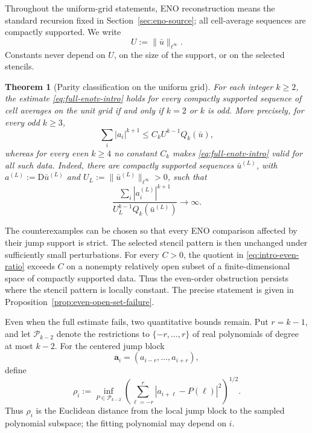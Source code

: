 \documentclass[11pt]{amsart}
\theoremstyle{plain}
\theoremstyle{definition}
\theoremstyle{remark}
\numberwithin{equation}{section}
\theoremstyle{plain}
\newtheorem{lettertheorem}{Theorem}
\begin{document}
Throughout the uniform-grid statements, ENO reconstruction means the standard
recursion fixed in Section~\ref{sec:eno-source}; all cell-average sequences are
compactly supported.  We write
\[
	U:=\|\bar u\|_{\ell^\infty}.
\]
Constants never depend on $U$, on the size of the support, or on the selected
stencils.

\begin{lettertheorem}[Parity classification on the uniform grid]\label{thm:A}
	For each integer $k\ge2$, the estimate
	\eqref{eq:full-enotv-intro} holds for every compactly supported sequence of
	cell averages on the unit grid if and only if $k=2$ or $k$ is odd.  More
	precisely, for every odd $k\ge3$,
	\begin{equation}\label{eq:intro-odd-main}
		\sum_i|a_i|^{k+1}\le C_k U^{k-1}Q_k(\bar u),
	\end{equation}
	whereas for every even $k\ge4$ no constant $C_k$ makes
	\eqref{eq:full-enotv-intro} valid for all such data.  Indeed, there are
	compactly supported sequences $\bar u^{(L)}$, with
	$a^{(L)}:=\mathrm D\bar u^{(L)}$ and
	$U_L:=\|\bar u^{(L)}\|_{\ell^\infty}>0$, such that
	\begin{equation}\label{eq:intro-even-ratio}
		\frac{\displaystyle\sum_i|a_i^{(L)}|^{k+1}}
		{\displaystyle U_L^{k-1}Q_k(\bar u^{(L)})}
		\longrightarrow\infty.
	\end{equation}
\end{lettertheorem}


The counterexamples can be chosen so that every ENO comparison affected by
their jump support is strict.  The selected stencil pattern is then unchanged
under sufficiently small perturbations.  For every $C>0$, the quotient in
\eqref{eq:intro-even-ratio} exceeds $C$ on a nonempty relatively open subset
of a finite-dimensional space of compactly supported data.  Thus the
even-order obstruction persists where the stencil pattern is locally
constant.  The precise statement is given in
Proposition~\ref{prop:even-open-set-failure}.

Even when the full estimate fails, two quantitative bounds remain.  Put
$r=k-1$, and let $\mathcal P_{k-2}$ denote the restrictions to
$\{-r,\ldots,r\}$ of real polynomials of degree at most $k-2$.  For the
centered jump block
\[
	\mathbf a_i=(a_{i-r},\ldots,a_{i+r}),
\]
define
\begin{equation}\label{eq:intro-rho}
	\rho_i:=\inf_{P\in\mathcal P_{k-2}}
	\left(\sum_{\ell=-r}^{r}|a_{i+\ell}-P(\ell)|^2\right)^{1/2}.
\end{equation}
Thus $\rho_i$ is the Euclidean distance from the local jump block to the
sampled polynomial subspace; the fitting polynomial may depend on $i$.
\end{document}
